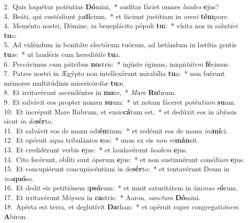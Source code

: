 {2.~}Quis loquétur poténtias \textbf{Dó}mini,~* audítas fáciet omnes \textit{lau}\textit{des} \textbf{e}jus?\\
{3.~}Beáti, qui custódiunt ju\textbf{dí}cium,~* et fáciunt justítiam in \textit{om}\textit{ni} \textbf{tém}pore.\\
{4.~}Meménto nostri, Dómine, in beneplácito pópuli \textbf{tu}i:~* vísita nos in salu\textit{tá}\textit{ri} \textbf{tu}o:\\
{5.~}Ad vidéndum in bonitáte electórum tuórum, ad lætándum in lætítia gentis \textbf{tu}æ:~* ut laudéris cum heredi\textit{tá}\textit{te} \textbf{tu}a.\\
{6.~}Peccávimus cum pátribus \textbf{no}stris:~* injúste égimus, iniqui\textit{tá}\textit{tem} \textbf{fé}cimus.\\
{7.~}Patres nostri in Ægýpto non intellexérunt mirabília \textbf{tu}a:~* non fuérunt mémores multitúdinis misericór\textit{di}\textit{æ} \textbf{tu}æ.\\
{8.~}Et irritavérunt ascendéntes in \textbf{ma}re,~* \textit{Ma}\textit{re} \textbf{Ru}brum.\\
{9.~}Et salvávit eos propter nomen \textbf{su}um:~* ut notam fáceret potén\textit{ti}\textit{am} \textbf{su}am.\\
{10.~}Et incrépuit Mare Rubrum, et exsic\textbf{cá}tum est,~* et dedúxit eos in abýssis sicut \textit{in} \textit{de}\textbf{sér}to.\\
{11.~}Et salvávit eos de manu odi\textbf{én}tium:~* et redémit eos de manu \textit{i}\textit{ni}\textbf{mí}ci.\\
{12.~}Et opéruit aqua tribulántes \textbf{e}os:~* unus ex eis \textit{non} \textit{re}\textbf{mán}sit.\\
{13.~}Et credidérunt verbis \textbf{e}jus:~* et laudavérunt \textit{lau}\textit{dem} \textbf{e}jus.\\
{14.~}Cito fecérunt, oblíti sunt óperum \textbf{e}jus:~* et non sustinuérunt consí\textit{li}\textit{um} \textbf{e}jus.\\
{15.~}Et concupiérunt concupiscéntiam in de\textbf{sér}to:~* et tentavérunt Deum in \textit{i}\textit{na}\textbf{quó}so.\\
{16.~}Et dedit eis petitiónem i\textbf{psó}rum:~* et misit saturitátem in áni\textit{mas} \textit{e}\textbf{ó}rum.\\
{17.~}Et irritavérunt Móysen in \textbf{ca}stris:~* Aaron, \textit{san}\textit{ctum} \textbf{Dó}mini.\\
{18.~}Apérta est terra, et deglutívit \textbf{Da}than:~* et opéruit super congregati\textit{ó}\textit{nem} \textbf{A}biron.\\

